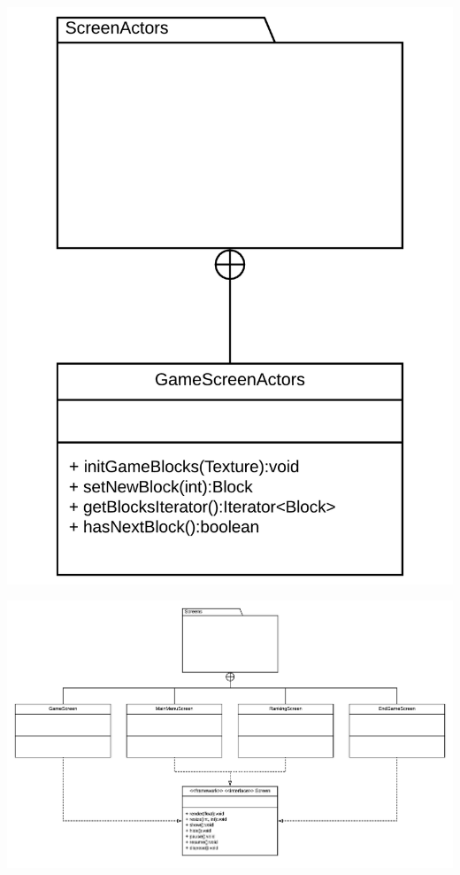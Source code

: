\documentclass{article}
\begin{document}
\begin{center}
    \includegraphics[scale=0.1]{actors.png}
\end{center}

\begin{flushleft}
    \includegraphics[scale=0.2]{screens.png}
\end{flushleft}
\end{document}
